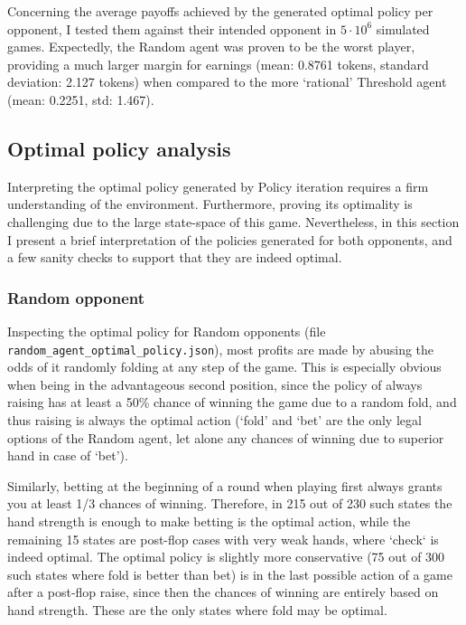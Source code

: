 Concerning the average payoffs achieved by the generated optimal policy per opponent, I tested them against their intended opponent in $5\cdot10^6$ simulated games. Expectedly, the Random agent was proven to be the worst player, providing a much larger margin for earnings (mean: 0.8761 tokens, standard deviation: 2.127 tokens) when compared to the more `rational' Threshold agent (mean: 0.2251, std: 1.467). 

\subsection{Optimal policy analysis}

Interpreting the optimal policy generated by Policy iteration requires a firm understanding of the environment. Furthermore, proving its optimality is challenging due to the large state-space of this game. Nevertheless, in this section I present a brief interpretation of the policies generated for both opponents, and a few sanity checks to support that they are indeed optimal.

\subsubsection{Random opponent}

Inspecting the optimal policy for Random opponents (file \Verb|random_agent_optimal_policy.json|), most profits are made by abusing the odds of it randomly folding at any step of the game. This is especially obvious when being in the advantageous second position, since the policy of always raising has at least a 50\% chance of winning the game due to a random fold, and thus raising is always the optimal action (`fold' and `bet' are the only legal options of the Random agent, let alone any chances of winning due to superior hand in case of `bet').

Similarly, betting at the beginning of a round when playing first always grants you at least 1/3 chances of winning. Therefore, in 215 out of 230 such states the hand strength is enough to make betting is the optimal action, while the remaining 15 states are post-flop cases with very weak hands, where `check` is indeed optimal. The optimal policy is slightly more conservative (75 out of 300 such states where fold is better than bet) is in the last possible action of a game after a post-flop raise, since then the chances of winning are entirely based on hand strength. These are the only states where fold may be optimal.

